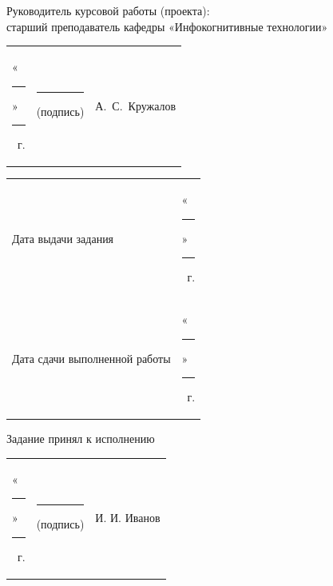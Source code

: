 \documentclass[14pt, a4paper]{extarticle}
\begin{document}

Руководитель курсовой работы (проекта): \\ старший преподаватель кафедры
«Инфокогнитивные технологии»

{
\renewcommand{\arraystretch}{2}
\noindent
\begin{tabularx}{\textwidth}{@{} P{0.45\textwidth} P{0.3\textwidth} P{0.25\textwidth} @{}}

    «\rule{0.8cm}{0.4pt}» \quad \rule{2cm}{0.4pt} ~г. &
    \centering \rule{3.5cm}{0.4pt} \par \footnotesize (подпись) &
    \hfill А.~С.~Кружалов                                         \\
\end{tabularx}

\begin{tabularx}{\textwidth}{@{} P{0.45\textwidth} P{0.55\textwidth} @{}}
    Дата выдачи задания           &
    \hfill «\rule{0.8cm}{0.4pt}» \quad \rule{2cm}{0.4pt} ~г. \\

    Дата сдачи выполненной работы &
    \hfill «\rule{0.8cm}{0.4pt}» \quad \rule{2cm}{0.4pt} ~г. \\
\end{tabularx}
}

Задание принял к исполнению

{
\renewcommand{\arraystretch}{1.5}
\begin{tabularx}{\textwidth}{@{} P{0.45\textwidth} P{0.3\textwidth} P{0.25\textwidth} @{}}

    «\rule{0.8cm}{0.4pt}» \quad \rule{2cm}{0.4pt} ~г. &
    \centering \rule{3.5cm}{0.4pt} \par \footnotesize (подпись) &
    \hfill И. И. Иванов                                            \\
\end{tabularx}
}
\end{document}
